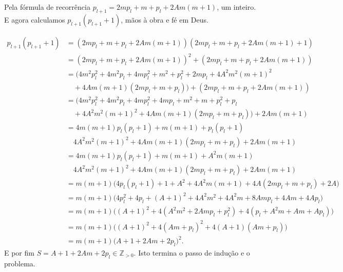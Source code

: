 \documentclass[main.tex]{subfiles}
\begin{document}
\begin{solution}
Pela fórmula de recorrência $p_{l+1}=2mp_l+m+p_l+2Am(m+1)$, um inteiro. E agora calculamos $p_{l+1}(p_{l+1}+1)$, mãos à obra e fé em Deus.

\begin{align*}
p_{l+1}(p_{l+1}+1)
&=(2mp_l+m+p_l+2Am(m+1))(2mp_l+m+p_l+2Am(m+1)+1) \\
&=(2mp_l+m+p_l+2Am(m+1))^2+(2mp_l+m+p_l+2Am(m+1)) \\
&=(4m^2p_l^2+4m^2p_l+4mp_l^2+m^2+p_l^2+2mp_l+4A^2m^2(m+1)^2 \\
&\quad +4Am(m+1)(2mp_l+m+p_l)) + (2mp_l+m+p_l+2Am(m+1)) \\
&=(4m^2p_l^2+4m^2p_l+4mp_l^2+4mp_l+m^2+m+p_l^2+p_l \\
&\quad +4A^2m^2(m+1)^2+4Am(m+1)(2mp_l+m+p_l)) + 2Am(m+1) \\
&=4m(m+1)p_l(p_l+1)+m(m+1)+p_l(p_l+1) \\
&\quad 4A^2m^2(m+1)^2+4Am(m+1)(2mp_l+m+p_l) + 2Am(m+1) \\
&=4m(m+1)p_l(p_l+1)+m(m+1)+A^2m(m+1) \\
&\quad 4A^2m^2(m+1)^2+4Am(m+1)(2mp_l+m+p_l) + 2Am(m+1) \\
&=m(m+1)\Big(4p_l(p_l+1)+1+A^2+4A^2m(m+1)+4A(2mp_l+m+p_l)+2A\Big) \\
&=m(m+1)\Big(4p_l^2+4p_l+(A+1)^2+4A^2m^2+4A^2m+8Amp_l+4Am+4Ap_l\Big) \\
&=m(m+1)\Big((A+1)^2+4(A^2m^2+2Amp_l+p_l^2)+4(p_l+A^2m+Am+Ap_l)\Big) \\
&=m(m+1)\Big((A+1)^2+4(Am+p_l)^2+4(A+1)(Am+p_l)\Big) \\
&=m(m+1)\big(A+1+2Am+2p_l\big)^2.
\end{align*}
E por fim $S=A+1+2Am+2p_l\in\mathbb{Z}_{> 0}$.
Isto termina o passo de indução e o problema.
\end{solution}
\end{document}
